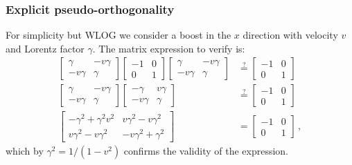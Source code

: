 \documentclass[main.tex]{subfiles}
\begin{document}

\subsubsection{Explicit pseudo-orthogonality}

For simplicity but WLOG we consider a boost in the \(x\) direction with velocity \(v\) and Lorentz factor \(\gamma\). The matrix expression to verify is:
%
\begin{subequations}
\begin{align}
  \begin{bmatrix}
  \gamma    & - v \gamma  \\
    -v \gamma & \gamma
  \end{bmatrix}
  \begin{bmatrix}
    -1 & 0 \\
    0 & 1
  \end{bmatrix}
  \begin{bmatrix}
    \gamma & -v \gamma \\
     -v \gamma&  \gamma
  \end{bmatrix}
  &\overset{?}{=}
  \begin{bmatrix}
  -1   & 0 \\
  0   & 1
\end{bmatrix} \\
  \begin{bmatrix}
  \gamma    & - v \gamma  \\
    -v \gamma & \gamma
  \end{bmatrix}
  \begin{bmatrix}
    -\gamma & v \gamma \\
    -v \gamma&  \gamma
  \end{bmatrix}
  &\overset{?}{=}
  \begin{bmatrix}
  -1   & 0 \\
  0   & 1
\end{bmatrix} \\
  \begin{bmatrix}
  -\gamma^2 + \gamma^2 v^2    & v \gamma^2 - v \gamma^2  \\
    v \gamma^2 -v \gamma^2 & -v\gamma^2 +\gamma^2
  \end{bmatrix}
  &=
  \begin{bmatrix}
  -1   & 0 \\
  0   & 1
\end{bmatrix}\,,
\end{align}
\end{subequations}
%
which by \(\gamma^2 = 1/ (1-v^2)\) confirms the validity of the expression.
\end{document}
